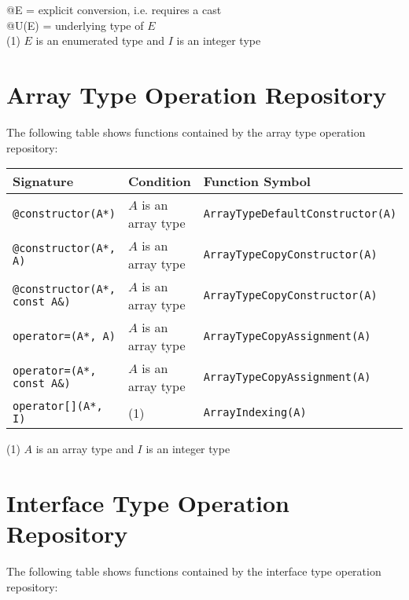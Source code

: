 \documentclass[a4paper,oneside,11pt]{book}
\theoremstyle{definition}
\begin{document}
\begin{flushleft}
@E = explicit conversion, i.e. requires a cast\\
@U(E) = underlying type of $E$\\
(1) $E$ is an enumerated type and $I$ is an integer type
\end{flushleft}

\section{Array Type Operation Repository}

The following table shows functions contained by the array type operation repository:

\begin{flushleft}
\begin{supertabular}{lll}
\textbf{Signature}& \textbf{Condition}& \textbf{Function Symbol}\\
\hline
\verb|@constructor(A*)|& $A$ is an array type& \verb|ArrayTypeDefaultConstructor(A)|\\
\verb|@constructor(A*, A)|& $A$ is an array type& \verb|ArrayTypeCopyConstructor(A)|\\
\verb|@constructor(A*, const A&)|& $A$ is an array type& \verb|ArrayTypeCopyConstructor(A)|\\
\verb|operator=(A*, A)|& $A$ is an array type& \verb|ArrayTypeCopyAssignment(A)|\\
\verb|operator=(A*, const A&)|& $A$ is an array type& \verb|ArrayTypeCopyAssignment(A)|\\
\verb|operator[](A*, I)|& (1)& \verb|ArrayIndexing(A)|\\
\hline
\end{supertabular}
\end{flushleft}

\begin{flushleft}
(1) $A$ is an array type and $I$ is an integer type
\end{flushleft}

\section{Interface Type Operation Repository}

The following table shows functions contained by the interface type operation repository:
\end{document}
